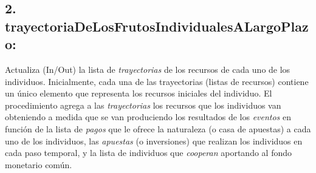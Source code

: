 \documentclass[10pt,a4paper]{article}
\begin{document}
	\subsection*{2. trayectoriaDeLosFrutosIndividualesALargoPlazo:}
	Actualiza (In/Out) la lista de 
	\textit{trayectorias}
	de los recursos de cada uno de los individuos. Inicialmente, cada una de las trayectorias (listas de recursos) contiene un único elemento que representa los recursos iniciales
	del individuo. El procedimiento agrega a las 
	\textit{trayectorias}
	los recursos que los individuos van obteniendo a medida que se van produciendo los resultados de los 
	\textit{eventos}
	en función de la lista de 
	\textit{pagos}
	que le ofrece la naturaleza (o casa de apuestas) a cada uno de los individuos, las 
	\textit{apuestas}
	(o inversiones) que realizan los individuos en cada paso temporal, y la lista de individuos que 
	\textit{cooperan}
	aportando al fondo monetario común.
\end{document}
